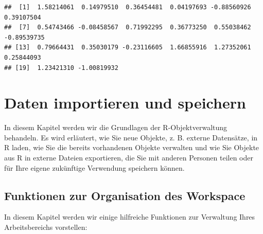 \documentclass[
]{book}
\begin{document}
\begin{verbatim}
##  [1]  1.58214061  0.14979510  0.36454481  0.04197693 -0.88560926  0.39107504
##  [7]  0.54743466 -0.08458567  0.71992295  0.36773250  0.55038462 -0.89539735
## [13]  0.79664431  0.35030179 -0.23116605  1.66855916  1.27352061  0.25844093
## [19]  1.23421310 -1.00819932
\end{verbatim}

\hypertarget{daten-importieren-und-speichern}{%
\chapter{Daten importieren und speichern}\label{daten-importieren-und-speichern}}

In diesem Kapitel werden wir die Grundlagen der R-Objektverwaltung behandeln. Es wird erläutert, wie Sie neue Objekte, z. B. externe Datensätze, in R laden, wie Sie die bereits vorhandenen Objekte verwalten und wie Sie Objekte aus R in externe Dateien exportieren, die Sie mit anderen Personen teilen oder für Ihre eigene zukünftige Verwendung speichern können.

\hypertarget{funktionen-zur-organisation-des-workspace}{%
\section{Funktionen zur Organisation des Workspace}\label{funktionen-zur-organisation-des-workspace}}

In diesem Kapitel werden wir einige hilfreiche Funktionen zur Verwaltung Ihres Arbeitsbereichs vorstellen:
\end{document}
